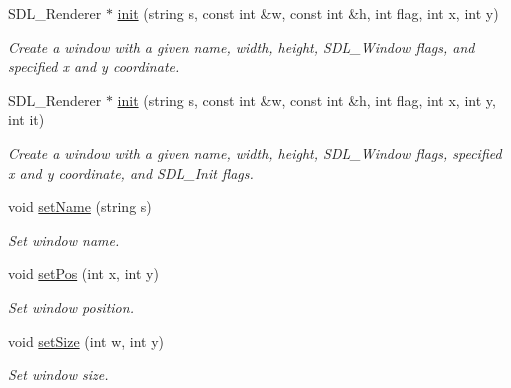 \begin{DoxyCompactItemize}
\mbox{\label{classEngine_a4f80e210f2ae48208eed4ad17c309120}} 
S\+D\+L\+\_\+\+Renderer $\ast$ \hyperlink{classEngine_a4f80e210f2ae48208eed4ad17c309120}{init} (string s, const int \&w, const int \&h, int flag, int x, int y)
\begin{DoxyCompactList}\small\item\em Create a window with a given name, width, height, S\+D\+L\+\_\+\+Window flags, and specified x and y coordinate. \end{DoxyCompactList}\item 
\mbox{\label{classEngine_aa96fc831b44b6aae0f499360609c574d}} 
S\+D\+L\+\_\+\+Renderer $\ast$ \hyperlink{classEngine_aa96fc831b44b6aae0f499360609c574d}{init} (string s, const int \&w, const int \&h, int flag, int x, int y, int it)
\begin{DoxyCompactList}\small\item\em Create a window with a given name, width, height, S\+D\+L\+\_\+\+Window flags, specified x and y coordinate, and S\+D\+L\+\_\+\+Init flags. \end{DoxyCompactList}\item 
\mbox{\label{classEngine_ae59bcd31693811574953ba835ecb09bb}} 
void \hyperlink{classEngine_ae59bcd31693811574953ba835ecb09bb}{set\+Name} (string s)
\begin{DoxyCompactList}\small\item\em Set window name. \end{DoxyCompactList}\item 
\mbox{\label{classEngine_a6133368973d175ef8915cc8033958b2b}} 
void \hyperlink{classEngine_a6133368973d175ef8915cc8033958b2b}{set\+Pos} (int x, int y)
\begin{DoxyCompactList}\small\item\em Set window position. \end{DoxyCompactList}\item 
\mbox{\label{classEngine_ada9e7e5de3b47113fc39fcabfe298f9e}} 
void \hyperlink{classEngine_ada9e7e5de3b47113fc39fcabfe298f9e}{set\+Size} (int w, int y)
\begin{DoxyCompactList}\small\item\em Set window size. \end{DoxyCompactList}\item 

\end{DoxyCompactItemize}
